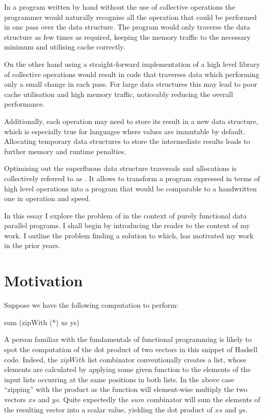\documentclass[preamble.tex]{subfiles}
\begin{document}
In a program written by hand without the use of collective operations the programmer would naturally recognise all the operation that could be performed in one pass over the data structure. The program would only traverse the data structure as few times as required, keeping the memory traffic to the necessary minimum and utilising cache correctly.

On the other hand using a straight-forward implementation of a high level library of collective operations would result in code that traverses data which performing only a small change in each pass. For large data structures this may lead to poor cache utilisation and high memory traffic, noticeably reducing the overall performance.

Additionally, each operation may need to store its result in a new data structure, which is especially true for languages where values are immutable by default. Allocating temporary data structures to store the intermediate results leads to further memory and runtime penalties.

Optimising out the superfluous data structure traversals and allocations is collectively referred to as . It allows to transform a program expressed in terms of high level operations into a program that would be comparable to a handwritten one in operation and speed.

In this essay I explore the problem of  in the context of purely functional data parallel programs. I shall begin by introducing the reader to the context of my work. I outline the problem finding a solution to which, has motivated my work in the prior years.


\clearpage
\section{Motivation}

Suppose we have the following computation to perform:

\begin{hscode}
sum (zipWith (*) xs ys)
\end{hscode}


A person familiar with the fundamentals of functional programming is likely to spot the computation of the dot product of two vectors in this snippet of Haskell code. Indeed, the $zipWith$ list combinator conventionally creates a list, whose elements are calculated by applying some given function to the elements of the input lists occurring at the same positions in both lists. In the above case {}``zipping'' with the product as the function will element-wise multiply the two vectors $xs$ and $ys$. Quite expectedly the $sum$ combinator will sum the elements of the resulting vector into a scalar value, yielding the dot product of $xs$ and $ys$.
\end{document}
